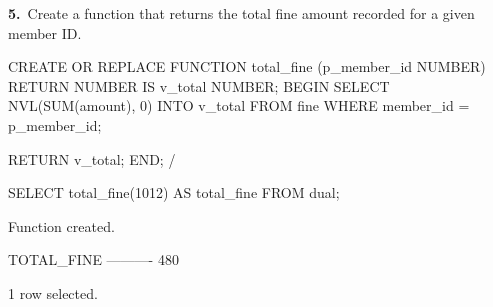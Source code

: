 \noindent\begin{minipage}{\linewidth}
\begingroup{}
{\fontsize{14}{17}\selectfont\textbf{5.}}\ Create a function that returns the total fine amount recorded for a given member ID.\par
\endgroup\vspace{12pt}


\begin{sqlcode}
CREATE OR REPLACE FUNCTION total_fine (p_member_id NUMBER)
RETURN NUMBER
IS
   v_total NUMBER;
BEGIN
   SELECT NVL(SUM(amount), 0) INTO v_total
   FROM fine
   WHERE member_id = p_member_id;

   RETURN v_total;
END;
/

SELECT total_fine(1012) AS total_fine FROM dual;
\end{sqlcode}

\vspace{18pt}


\begin{sqlout}[fontsize=\small]
Function created.

TOTAL_FINE
----------
       480

1 row selected.
\end{sqlout}
\end{minipage}\par\vspace{24pt}

